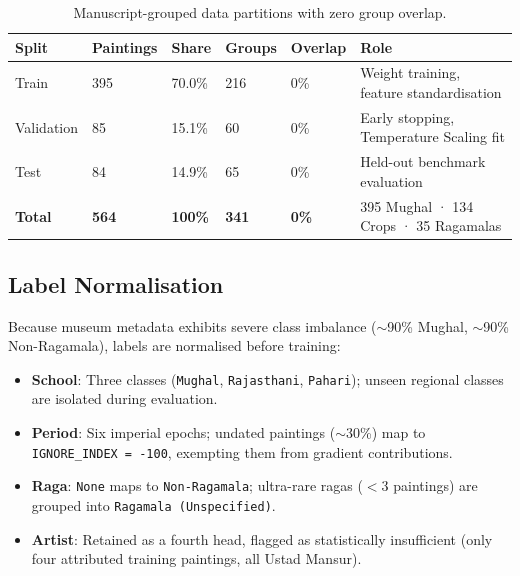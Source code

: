 \documentclass[12pt, a4paper, twoside]{article}
\begin{document}
\begin{table}[H]
  \centering
  \caption{Manuscript-grouped data partitions with zero group overlap.}
  \label{tab:splits}
  \begin{tabularx}{\linewidth}{L{2.4cm} C{1.5cm} C{1.4cm} C{2.0cm} C{1.4cm} L{3.5cm}}
    \toprule
    \textbf{Split} & \textbf{Paintings} & \textbf{Share} & \textbf{Groups} & \textbf{Overlap} & \textbf{Role}\\
    \midrule
    Train     & 395 & 70.0\% & 216 & 0\% & Weight training, feature standardisation\\
    Validation & 85 & 15.1\% & 60  & 0\% & Early stopping, Temperature Scaling fit\\
    Test      & 84  & 14.9\% & 65  & 0\% & Held-out benchmark evaluation\\
    \midrule
    \textbf{Total} & \textbf{564} & \textbf{100\%} & \textbf{341} & \textbf{0\%} & 395 Mughal · 134 Crops · 35 Ragamalas\\
    \bottomrule
  \end{tabularx}
\end{table}

\subsection{Label Normalisation}

Because museum metadata exhibits severe class imbalance ($\sim$90\% Mughal, $\sim$90\% Non-Ragamala), labels are normalised before training:

\begin{itemize}
  \item \textbf{School}: Three classes (\texttt{Mughal}, \texttt{Rajasthani}, \texttt{Pahari}); unseen regional classes are isolated during evaluation.
  \item \textbf{Period}: Six imperial epochs; undated paintings ($\sim$30\%) map to \texttt{IGNORE\_INDEX = -100}, exempting them from gradient contributions.
  \item \textbf{Raga}: \texttt{None} maps to \texttt{Non-Ragamala}; ultra-rare ragas ($<3$ paintings) are grouped into \texttt{Ragamala (Unspecified)}.
  \item \textbf{Artist}: Retained as a fourth head, flagged as statistically insufficient (only four attributed training paintings, all Ustad Mansur).
\end{itemize}

\end{document}
